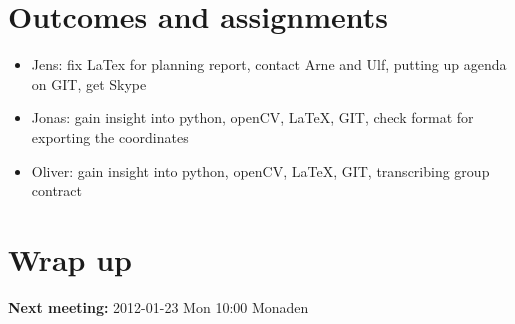 \documentclass[11pt]{article}
\begin{document}
\section{Outcomes and assignments}

\begin{itemize}
 
  \item Jens: fix LaTex for planning report, contact Arne and Ulf, putting up agenda on GIT, get Skype
  \item Jonas: gain insight into python, openCV, LaTeX, GIT, check format for exporting the coordinates
  \item Oliver: gain insight into python, openCV, LaTeX, GIT, transcribing group contract

\end{itemize}

\section{Wrap up}

\textbf{Next meeting:} 2012-01-23 Mon 10:00 Monaden
\end{document}
